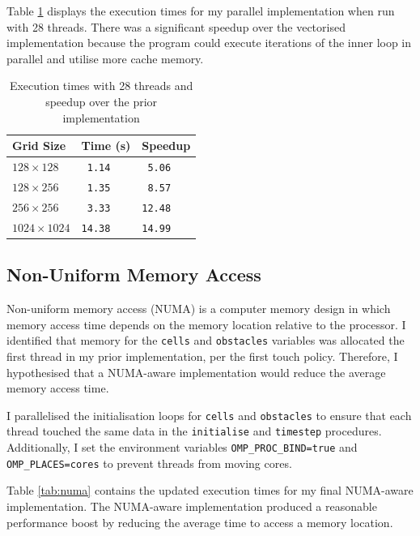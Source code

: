 \documentclass[twocolumn, a4paper]{article}
\begin{document}
Table \ref{tab:parallelised} displays the execution times for my parallel implementation when run with 28 threads.
There was a significant speedup over the vectorised implementation because the program could execute iterations of the inner loop in parallel and utilise more cache memory.

\begin{table}[htbp]
  \begin{center}
  \caption{Execution times with 28 threads and speedup over the prior implementation}\label{tab:parallelised}
  \begin{tabular}[t]{l | l l} 
      \hline\hline
      Grid Size&Time (s)&Speedup\\
      \hline
      $128 \times 128$&\texttt{ 1.14}&\texttt{ 5.06}\\
      $128 \times 256$&\texttt{ 1.35}&\texttt{ 8.57}\\
      $256 \times 256$&\texttt{ 3.33}&\texttt{12.48}\\
      $1024 \times 1024$&\texttt{14.38}&\texttt{14.99}\\
      \hline
    \end{tabular}
  \end{center}
  \vspace{-1em}
\end{table}

\subsection{Non-Uniform Memory Access}

Non-uniform memory access (NUMA) is a computer memory design in which memory access time depends on the memory location relative to the processor.
I identified that memory for the \texttt{cells} and \texttt{obstacles} variables was allocated the first thread in my prior implementation, per the first touch policy.
Therefore, I hypothesised that a NUMA-aware implementation would reduce the average memory access time.

I parallelised the initialisation loops for \texttt{cells} and \texttt{obstacles} to ensure that each thread touched the same data in the \texttt{initialise} and \texttt{timestep} procedures.
Additionally, I set the environment variables \texttt{OMP\_PROC\_BIND=true} and \texttt{OMP\_PLACES=cores} to prevent threads from moving cores.

Table \ref{tab:numa} contains the updated execution times for my final NUMA-aware implementation.
The NUMA-aware implementation produced a reasonable performance boost by reducing the average time to access a memory location.
\end{document}
